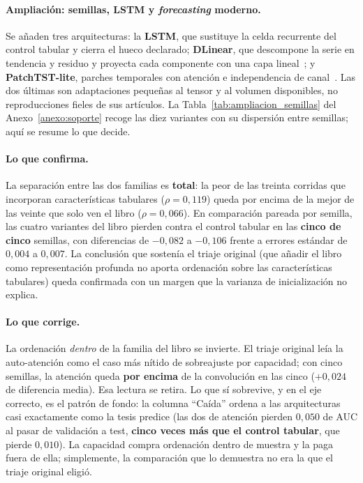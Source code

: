 \paragraph{Ampliación: semillas, LSTM y \emph{forecasting} moderno.} Se añaden tres
arquitecturas: la \textbf{LSTM}, que sustituye la celda recurrente del control tabular y
cierra el hueco declarado; \textbf{DLinear}, que descompone la serie en tendencia y residuo
y proyecta cada componente con una capa lineal~\cite{zeng2023dlinear}; y
\textbf{PatchTST-lite}, parches temporales con atención e independencia de
canal~\cite{nie2023patchtst}. Las dos últimas son adaptaciones pequeñas al tensor y al
volumen disponibles, no reproducciones fieles de sus artículos. La
Tabla~\ref{tab:ampliacion_semillas} del Anexo~\ref{anexo:soporte} recoge las diez
variantes con su dispersión entre semillas; aquí se resume lo que decide.

\paragraph{Lo que confirma.} La separación entre las dos familias es \textbf{total}: la peor
de las treinta corridas que incorporan características tabulares ($\rho = 0{,}119$) queda por
encima de la mejor de las veinte que solo ven el libro ($\rho = 0{,}066$). En comparación
pareada por semilla, las cuatro variantes del libro pierden contra el control tabular en las
\textbf{cinco de cinco} semillas, con diferencias de $-0{,}082$ a $-0{,}106$ frente a errores
estándar de $0{,}004$ a $0{,}007$. La conclusión que sostenía el triaje original (que añadir
el libro como representación profunda no aporta ordenación sobre las características
tabulares) queda confirmada con un margen que la varianza de inicialización no explica.

\paragraph{Lo que corrige.} La ordenación \emph{dentro} de la familia del libro se invierte.
El triaje original leía la auto-atención como el caso más nítido de sobreajuste por
capacidad; con cinco semillas, la atención queda \textbf{por encima} de la convolución en las
cinco ($+0{,}024$ de diferencia media). Esa lectura se retira. Lo que sí sobrevive, y en el
eje correcto, es el patrón de fondo: la columna ``Caída'' ordena a las arquitecturas casi
exactamente como la tesis predice (las dos de atención pierden $0{,}050$ de AUC al pasar de
validación a test, \textbf{cinco veces más que el control tabular}, que pierde $0{,}010$). La
capacidad compra ordenación dentro de muestra y la paga fuera de ella; simplemente, la
comparación que lo demuestra no era la que el triaje original eligió.

